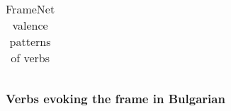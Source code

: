 \documentclass[output=paper,colorlinks,citecolor=brown]{langscibook}
\begin{document}
\begin{table}
\begin{tabularx}{\textwidth}{lrQ}
\end{tabularx}
\caption{FrameNet valence patterns of  verbs}
\label{tab:4:self-motion-valence-framenet}
\end{table} 

\subsubsection{Verbs evoking the  frame in Bulgarian}
\end{document}
